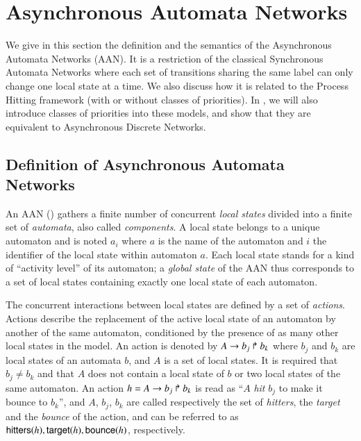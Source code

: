 \section{Asynchronous Automata Networks}
\label{sec:ph}

We give in this section the definition and the semantics of the Asynchronous Automata Networks (AAN).
It is a restriction of the classical Synchronous Automata Networks
where each set of transitions sharing the same label
can only change one local state at a time.
We also discuss how it is related to the Process Hitting framework
(with or without classes of priorities).
In , we will also introduce classes of priorities into these models,
and show that they are equivalent to Asynchronous Discrete Networks.



\subsection{Definition of Asynchronous Automata Networks}
\label{ssec:PH}

An AAN () gathers a finite number of concurrent \emph{local states} divided into a finite set of \emph{automata}, also called \emph{components}.
A local state belongs to a unique automaton and is noted $a_i$ where $a$ is the name of the automaton and $i$ the identifier of the local state within automaton $a$.
Each local state stands for a kind of “activity level” of its automaton; a \emph{global state} of the AAN thus corresponds to a set of local states containing exactly one local state of each automaton.

The concurrent interactions between local states are defined by a set of \emph{actions}.
Actions describe the replacement of the active local state of an automaton by another of the same automaton, conditioned by the presence of as many other local states in the model.
An action is denoted by $A\rightarrow b_j\Rsh b_k$ where $b_j$ and $b_k$ are local states of an automata $b$, and $A$ is a set of local states.
It is required that $b_j \neq b_k$ and that
$A$ does not contain a local state of $b$ or two local states of the same automaton.
An action $h=A\rightarrow b_j\Rsh b_k$ is read as ``$A$ \emph{hit} $b_j$ to make it bounce to $b_k$'', and $A$, $b_j$, $b_k$ are called respectively the set of \emph{hitters}, the \emph{target} and the \emph{bounce} of the action, and can be referred to as $\mathsf{hitters}(h), \mathsf{target}(h), \mathsf{bounce}(h)$, respectively.

